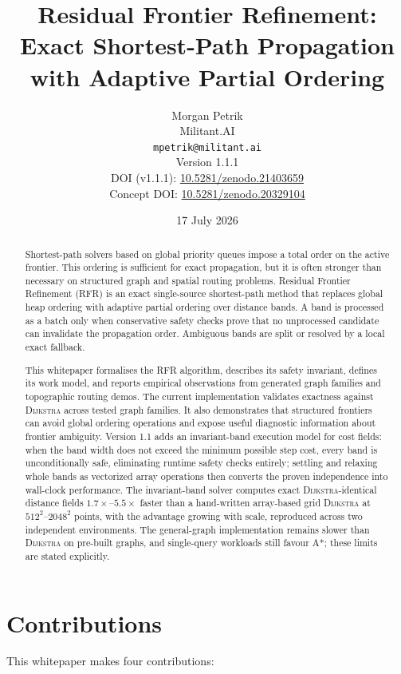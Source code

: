 \documentclass[11pt]{article}
\title{Residual Frontier Refinement: Exact Shortest-Path Propagation with Adaptive Partial Ordering}
\author{
  Morgan Petrik\\
  Militant.AI\\
  \texttt{mpetrik@militant.ai}\\[0.75em]
  Version 1.1.1\\[0.25em]
  DOI (v1.1.1): \href{https://doi.org/10.5281/zenodo.21403659}{10.5281/zenodo.21403659}\\
  Concept DOI: \href{https://doi.org/10.5281/zenodo.20329104}{10.5281/zenodo.20329104}
}
\date{17 July 2026}
\newcommand{\RFR}{\textsc{RFR}}
\newcommand{\Dijkstra}{\textsc{Dijkstra}}
\begin{document}
\maketitle

\begin{abstract}
Shortest-path solvers based on global priority queues impose a total order on the active frontier. This ordering is sufficient for exact propagation, but it is often stronger than necessary on structured graph and spatial routing problems. Residual Frontier Refinement (\RFR{}) is an exact single-source shortest-path method that replaces global heap ordering with adaptive partial ordering over distance bands. A band is processed as a batch only when conservative safety checks prove that no unprocessed candidate can invalidate the propagation order. Ambiguous bands are split or resolved by a local exact fallback.

This whitepaper formalises the \RFR{} algorithm, describes its safety invariant, defines its work model, and reports empirical observations from generated graph families and topographic routing demos. The current implementation validates exactness against \Dijkstra{} across tested graph families. It also demonstrates that structured frontiers can avoid global ordering operations and expose useful diagnostic information about frontier ambiguity. Version 1.1 adds an invariant-band execution model for cost fields: when the band width does not exceed the minimum possible step cost, every band is unconditionally safe, eliminating runtime safety checks entirely; settling and relaxing whole bands as vectorized array operations then converts the proven independence into wall-clock performance. The invariant-band solver computes exact \Dijkstra{}-identical distance fields $1.7\times$--$5.5\times$ faster than a hand-written array-based grid \Dijkstra{} at $512^2$--$2048^2$ points, with the advantage growing with scale, reproduced across two independent environments. The general-graph implementation remains slower than \Dijkstra{} on pre-built graphs, and single-query workloads still favour A*; these limits are stated explicitly.
\end{abstract}

\section{Contributions}

This whitepaper makes four contributions:
\end{document}
